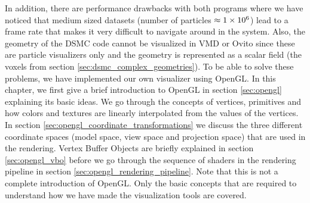 In addition, there are performance drawbacks with both programs where we have noticed that medium sized datasets (number of particles $\approx 1\times 10^{6}$) lead to a frame rate that makes it very difficult to navigate around in the system. Also, the geometry of the DSMC code cannot be visualized in VMD or Ovito since these are particle visualizers only and the geometry is represented as a scalar field (the voxels from section \ref{sec:dsmc_complex_geometries}). To be able to solve these problems, we have implemented our own visualizer using OpenGL. In this chapter, we first give a brief introduction to OpenGL in section \ref{sec:opengl} explaining its basic ideas. We go through the concepts of vertices, primitives and how colors and textures are linearly interpolated from the values of the vertices. In section \ref{sec:opengl_coordinate_transformations} we discuss the three different coordinate spaces (model space, view space and projection space) that are used in the rendering. Vertex Buffer Objects are briefly explained in section \ref{sec:opengl_vbo} before we go through the sequence of shaders in the rendering pipeline in section \ref{sec:opengl_rendering_pipeline}. Note that this is not a complete introduction of OpenGL. Only the basic concepts that are required to understand how we have made the visualization tools are covered.